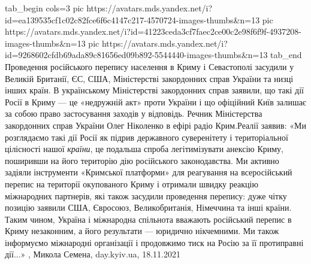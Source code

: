 \ifcmt
  tab_begin cols=3
     pic https://avatars.mds.yandex.net/i?id=ea139535cf1c02c82fce6f6c4147c217-4570724-images-thumbs&n=13
     pic https://avatars.mds.yandex.net/i?id=41223ceda3cf7faec2ce00c2e98f6f9f-4937208-images-thumbs&n=13
		 pic https://avatars.mds.yandex.net/i?id=9268602cfdb69ada89c81656ed09b892-5544440-images-thumbs&n=13
  tab_end
\fi
Проведення російського перепису населення в Криму і Севастополі засудили у
Великій Британії, ЄС, США, Міністерстві закордонних справ України та низці
інших країн. В українському Міністерстві закордонних справ заявили, що такі дії
Росії в Криму — це «недружній акт» проти України і що офіційний Київ залишає за
собою право застосування заходів у відповідь.  Речник Міністерства закордонних
справ України Олег Ніколенко в ефірі радіо Крим.Реалії заявив: «Ми розглядаємо
такі дії Росії як підрив державного суверенітету і територіальної цілісності
нашої \emph{країни}, це подальша спроба легітимізувати анексію Криму, поширивши
на його територію дію російського законодавства. Ми активно задіяли інструменти
«Кримської платформи» для реагування на всеросійський перепис на території
окупованого Криму і отримали швидку реакцію міжнародних партнерів, які також
засудили проведення перепису: дуже чітку позицію заявили США, Євросоюз,
Великобританія, Німеччина та інші країни. Таким чином, Україна і міжнародна
спільнота вважають російський перепис в Криму незаконним, а його результати —
юридично нікчемними. Ми також інформуємо міжнародні організації і продовжимо
тиск на Росію за її протиправні дії...»
, 
Микола Семена, day.kyiv.ua, 18.11.2021

